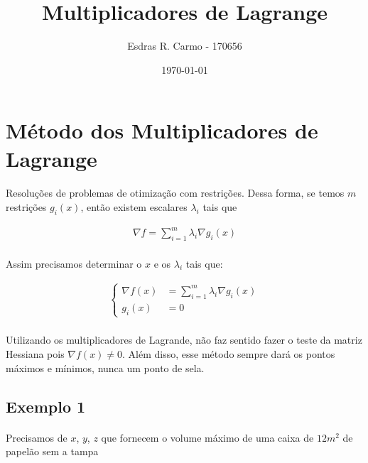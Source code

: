 \documentclass{article}
\author{Esdras R. Carmo - 170656}
\title{Multiplicadores de Lagrange}
\date{\today}
\begin{document}
    \maketitle
    
    \section{Método dos Multiplicadores de Lagrange}
        \paragraph{}
        Resoluções de problemas de otimização com restrições. Dessa forma, se temos $m$ restrições $g_i(x)$, então
        existem escalares $\lambda_i$ tais que

        \begin{align*}
            \nabla f = \sum_{i=1}^m \lambda_i \nabla g_i(x)
        \end{align*}

        \paragraph{}
        Assim precisamos determinar o $x$ e os $\lambda_i$ tais que:

        \begin{align*}
            \begin{cases}
                \nabla f(x) &= \sum_{i=1}^m \lambda_i \nabla g_i(x)\\
                g_i(x) &= 0
            \end{cases}
        \end{align*}

        \paragraph{}
        Utilizando os multiplicadores de Lagrande, não faz sentido fazer o teste da matriz Hessiana pois $\nabla f(x) \neq 0$. Além disso,
        esse método sempre dará os pontos máximos e mínimos, nunca um ponto de sela.


        \subsection{Exemplo 1}
            \paragraph{}
            Precisamos de $x$, $y$, $z$ que fornecem o volume máximo de uma caixa de $12m^2$ de papelão sem
            a tampa
\end{document}
